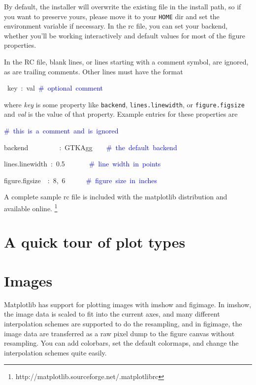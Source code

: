 By default, the installer will overwrite the existing file in the install path,
so if you want to preserve yours, please move it to your \texttt{HOME} dir and
set the environment variable if necessary.  In the rc file, you can set your
backend, whether you'll be working interactively and default values for most of
the figure properties.

In the RC file, blank lines, or lines starting with a comment symbol,
are ignored, as are trailing comments. Other lines must have the format

\begin{lyxcode}
~key~:~val~\textcolor{blue}{\#~optional~comment}~
\end{lyxcode}
where \textit{key} is some property like \texttt{backend}, \texttt{lines.linewidth},
or \texttt{figure.figsize} and \textit{val} is the value of that property.
Example entries for these properties are

\begin{lyxcode}
\textcolor{blue}{\#~this~is~a~comment~and~is~ignored~}

backend~~~~~~~~~:~GTKAgg~~~~\textcolor{blue}{\#~the~default~backend~}

lines.linewidth~:~0.5~~~~~~~\textcolor{blue}{\#~line~width~in~points}~

figure.figsize~~:~8,~6~~~~~~\textcolor{blue}{\#~figure~size~in~inches~}
\end{lyxcode}
A complete sample rc file is included with the matplotlib distribution
and available online.%
\footnote{http://matplotlib.sourceforge.net/.matplotlibrc%
}


\section[Plot Types]{A quick tour of plot types}


\section{Images}

Matplotlib has support for plotting images with imshow and figimage.
In imshow, the image data is scaled to fit into the current axes,
and many different interpolation schemes are supported to do the resampling,
and in figimage, the image data are transferred as a raw pixel dump
to the figure canvas without resampling. You can add colorbars, set
the default colormaps, and change the interpolation schemes quite
easily. 

